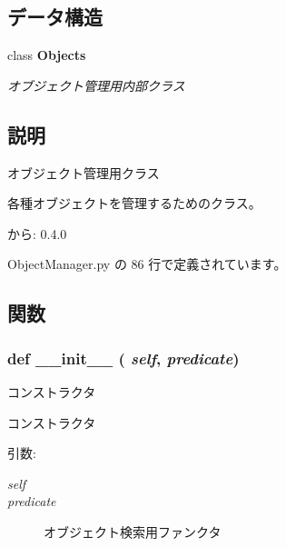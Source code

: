\subsection*{データ構造}
\begin{CompactItemize}
\item 
class {\bf Objects}
\begin{CompactList}\small\item\em オブジェクト管理用内部クラス \item\end{CompactList}\end{CompactItemize}


\subsection{説明}
オブジェクト管理用クラス 

各種オブジェクトを管理するためのクラス。

\begin{Desc}
\item[から:]0.4.0 \end{Desc}


 ObjectManager.py の 86 行で定義されています。

\subsection{関数}
\subsubsection{\setlength{\rightskip}{0pt plus 5cm}def \_\-\_\-init\_\-\_\- ( {\em self},  {\em predicate})}\label{classsource__py_1_1_object_manager_1_1_object_manager_c775ee34451fdfa742b318538164070e}


コンストラクタ 

コンストラクタ

\begin{Desc}
\item[引数:]
\begin{description}
\item[{\em self}]\item[{\em predicate}]オブジェクト検索用ファンクタ \end{description}
\end{Desc}


